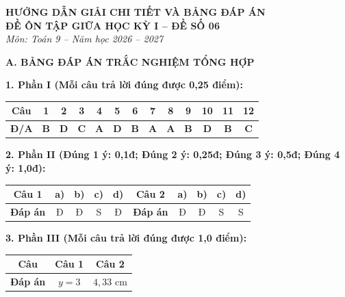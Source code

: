 \documentclass[12pt,a4paper]{article}
\begin{document}
\begin{center}
  \textbf{\Large HƯỚNG DẪN GIẢI CHI TIẾT VÀ BẢNG ĐÁP ÁN}\\
  \textbf{\large ĐỀ ÔN TẬP GIỮA HỌC KỲ I -- ĐỀ SỐ 06}\\
  \textit{Môn: Toán 9 -- Năm học 2026 -- 2027}
\end{center}
\vspace{2mm}

\noindent\textbf{\large A. BẢNG ĐÁP ÁN TRẮC NGHIỆM TỔNG HỢP}
\vspace{1mm}

\noindent\textbf{1. Phần I (Mỗi câu trả lời đúng được 0,25 điểm):}
\begin{center}
\begin{tabular}{|c|c|c|c|c|c|c|c|c|c|c|c|c|}
\hline
\textbf{Câu} & \textbf{1} & \textbf{2} & \textbf{3} & \textbf{4} & \textbf{5} & \textbf{6} & \textbf{7} & \textbf{8} & \textbf{9} & \textbf{10} & \textbf{11} & \textbf{12} \\
\hline
\textbf{Đ/A} & \textbf{B} & \textbf{D} & \textbf{C} & \textbf{A} & \textbf{D} & \textbf{B} & \textbf{A} & \textbf{A} & \textbf{B} & \textbf{D} & \textbf{B} & \textbf{C} \\
\hline
\end{tabular}
\end{center}
\vspace{0.5mm}

\noindent\textbf{2. Phần II (Đúng 1 ý: 0,1đ; Đúng 2 ý: 0,25đ; Đúng 3 ý: 0,5đ; Đúng 4 ý: 1,0đ):}
\begin{center}
\begin{tabular}{|c|c|c|c|c||c|c|c|c|c|}
\hline
\textbf{Câu 1} & \textbf{a)} & \textbf{b)} & \textbf{c)} & \textbf{d)} & \textbf{Câu 2} & \textbf{a)} & \textbf{b)} & \textbf{c)} & \textbf{d)} \\
\hline
\textbf{Đáp án} & Đ & Đ & S & Đ & \textbf{Đáp án} & Đ & Đ & S & S \\
\hline
\end{tabular}
\end{center}
\vspace{0.5mm}

\noindent\textbf{3. Phần III (Mỗi câu trả lời đúng được 1,0 điểm):}
\begin{center}
\begin{tabular}{|c|c|c|}
\hline
\textbf{Câu} & \textbf{Câu 1} & \textbf{Câu 2} \\
\hline
\textbf{Đáp án} & $y = 3$ & $4{,}33\text{ cm}$ \\
\hline
\end{tabular}
\end{center}
\vspace{2mm}
\end{document}
